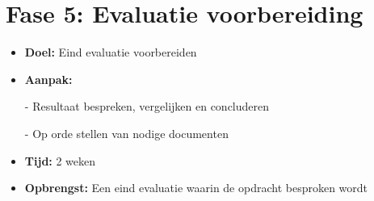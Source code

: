 \section{Fase 5: Evaluatie voorbereiding}
\label{sec:m-evaluatie-voorbereiding}
\begin{itemize}
    \item \textbf{Doel:}
    Eind evaluatie voorbereiden
    \item \textbf{Aanpak:}
    \item[-] Resultaat bespreken, vergelijken en concluderen
    \item[-] Op orde stellen van nodige documenten
    \item \textbf{Tijd:} 2 weken
    \item \textbf{Opbrengst:}
    Een eind evaluatie waarin de opdracht besproken wordt
\end{itemize}


